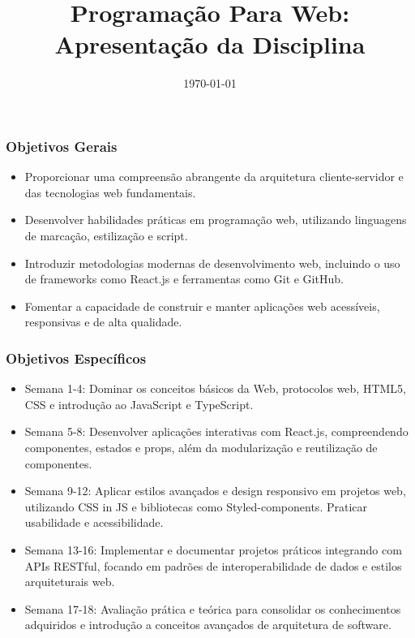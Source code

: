 \title{Programação Para Web: Apresentação da Disciplina}
\date{\today}
\frame{\titlepage}

\begin{frame}[fragile]
  \frametitle{Objetivos Gerais}
  \begin{itemize}
    \item Proporcionar uma compreensão abrangente da arquitetura cliente-servidor e das tecnologias web fundamentais.
    \item Desenvolver habilidades práticas em programação web, utilizando linguagens de marcação, estilização e script.
    \item Introduzir metodologias modernas de desenvolvimento web, incluindo o uso de frameworks como React.js e ferramentas como Git e GitHub.
    \item Fomentar a capacidade de construir e manter aplicações web acessíveis, responsivas e de alta qualidade.
  \end{itemize}
\end{frame}

\begin{frame}[fragile]
  \frametitle{Objetivos Específicos}
  \begin{itemize}
    \item Semana 1-4: Dominar os conceitos básicos da Web, protocolos web, HTML5, CSS e introdução ao JavaScript e TypeScript.
    \item Semana 5-8: Desenvolver aplicações interativas com React.js, compreendendo componentes, estados e props, além da modularização e reutilização de componentes.
    \item Semana 9-12: Aplicar estilos avançados e design responsivo em projetos web, utilizando CSS in JS e bibliotecas como Styled-components. Praticar usabilidade e acessibilidade.
    \item Semana 13-16: Implementar e documentar projetos práticos integrando com APIs RESTful, focando em padrões de interoperabilidade de dados e estilos arquiteturais web.
    \item Semana 17-18: Avaliação prática e teórica para consolidar os conhecimentos adquiridos e introdução a conceitos avançados de arquitetura de software.
  \end{itemize}
\end{frame}

